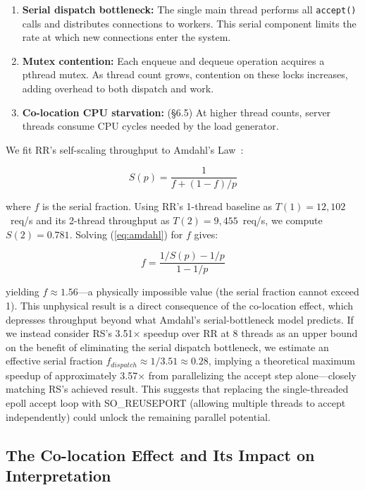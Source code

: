 \documentclass[conference]{IEEEtran}
\begin{document}
\begin{enumerate}
    \item \textbf{Serial dispatch bottleneck:} The single main thread performs all \texttt{accept()} calls and distributes connections to workers. This serial component limits the rate at which new connections enter the system.
    \item \textbf{Mutex contention:} Each enqueue and dequeue operation acquires a pthread mutex. As thread count grows, contention on these locks increases, adding overhead to both dispatch and work.
    \item \textbf{Co-location CPU starvation:} (\S6.5) At higher thread counts, server threads consume CPU cycles needed by the load generator.
\end{enumerate}

We fit RR's self-scaling throughput to Amdahl's Law~\cite{b9}:

\begin{equation}
S(p) = \frac{1}{f + (1-f)/p}
\label{eq:amdahl}
\end{equation}

where $f$ is the serial fraction. Using RR's 1-thread baseline as $T(1) = 12,102$~req/s and its 2-thread throughput as $T(2) = 9,455$~req/s, we compute $S(2) = 0.781$. Solving (\ref{eq:amdahl}) for $f$ gives:

\begin{equation}
f = \frac{1/S(p) - 1/p}{1 - 1/p}
\label{eq:f}
\end{equation}

yielding $f \approx 1.56$---a physically impossible value (the serial fraction cannot exceed 1). This unphysical result is a direct consequence of the co-location effect, which depresses throughput beyond what Amdahl's serial-bottleneck model predicts. If we instead consider RS's 3.51$\times$ speedup over RR at 8 threads as an upper bound on the benefit of eliminating the serial dispatch bottleneck, we estimate an effective serial fraction $f_{dispatch} \approx 1/3.51 \approx 0.28$, implying a theoretical maximum speedup of approximately 3.57$\times$ from parallelizing the accept step alone---closely matching RS's achieved result. This suggests that replacing the single-threaded epoll accept loop with SO\_REUSEPORT (allowing multiple threads to accept independently) could unlock the remaining parallel potential.

\subsection{The Co-location Effect and Its Impact on Interpretation}
\end{document}
